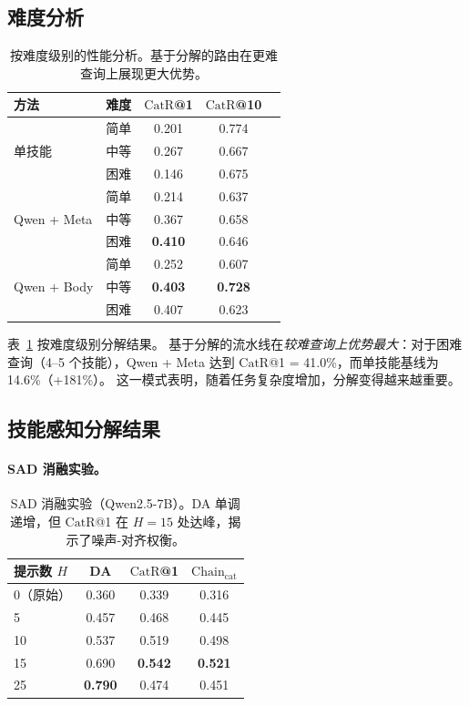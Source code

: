 \documentclass[11pt,a4paper]{ctexart}
\newcommand{\catrecall}{\text{CatR}}
\newcommand{\chaincat}{\text{Chain}_\text{cat}}
\begin{document}
\subsection{难度分析}

\begin{table}[t]
\centering
\small
\begin{tabular}{llccc}
\toprule
\textbf{方法} & \textbf{难度} & $\catrecall$\textbf{@1} & $\catrecall$\textbf{@10} \\
\midrule
\multirow{3}{*}{单技能} & 简单 & 0.201 & 0.774 \\
& 中等 & 0.267 & 0.667 \\
& 困难 & 0.146 & 0.675 \\
\midrule
\multirow{3}{*}{Qwen + Meta} & 简单 & 0.214 & 0.637 \\
& 中等 & 0.367 & 0.658 \\
& 困难 & \textbf{0.410} & 0.646 \\
\midrule
\multirow{3}{*}{Qwen + Body} & 简单 & 0.252 & 0.607 \\
& 中等 & \textbf{0.403} & \textbf{0.728} \\
& 困难 & 0.407 & 0.623 \\
\bottomrule
\end{tabular}
\caption{按难度级别的性能分析。基于分解的路由在更难查询上展现更大优势。}
\label{tab:difficulty}
\end{table}

表~\ref{tab:difficulty} 按难度级别分解结果。
基于分解的流水线在\emph{较难查询上优势最大}：对于困难查询（4--5 个技能），Qwen + Meta 达到 $\catrecall$@1 = 41.0\%，而单技能基线为 14.6\%（+181\%）。
这一模式表明，随着任务复杂度增加，分解变得越来越重要。

\subsection{技能感知分解结果}
\label{sec:sad-results}

\paragraph{SAD 消融实验。}

\begin{table}[t]
\centering
\small
\begin{tabular}{lccc}
\toprule
\textbf{提示数 $H$} & \textbf{DA} & $\catrecall$\textbf{@1} & $\chaincat$ \\
\midrule
0（原始） & 0.360 & 0.339 & 0.316 \\
5 & 0.457 & 0.468 & 0.445 \\
10 & 0.537 & 0.519 & 0.498 \\
15 & 0.690 & \textbf{0.542} & \textbf{0.521} \\
25 & \textbf{0.790} & 0.474 & 0.451 \\
\bottomrule
\end{tabular}
\caption{SAD 消融实验（Qwen2.5-7B）。DA 单调递增，但 $\catrecall$@1 在 $H{=}15$ 处达峰，揭示了噪声-对齐权衡。}
\label{tab:sad-ablation}
\end{table}
\end{document}
